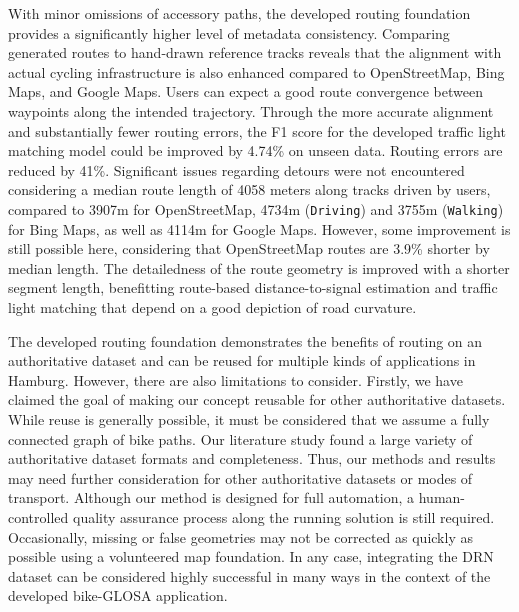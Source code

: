 With minor omissions of accessory paths, the developed routing foundation provides a significantly higher level of metadata consistency. Comparing generated routes to hand-drawn reference tracks reveals that the alignment with actual cycling infrastructure is also enhanced compared to OpenStreetMap, Bing Maps, and Google Maps. Users can expect a good route convergence between waypoints along the intended trajectory. Through the more accurate alignment and substantially fewer routing errors, the F1 score for the developed traffic light matching model could be improved by 4.74\% on unseen data. Routing errors are reduced by 41\%. Significant issues regarding detours were not encountered considering a median route length of 4058 meters along tracks driven by users, compared to 3907m for OpenStreetMap, 4734m (\texttt{Driving}) and 3755m (\texttt{Walking}) for Bing Maps, as well as 4114m for Google Maps. However, some improvement is still possible here, considering that OpenStreetMap routes are 3.9\% shorter by median length. The detailedness of the route geometry is improved with a shorter segment length, benefitting route-based distance-to-signal estimation and traffic light matching that depend on a good depiction of road curvature.

The developed routing foundation demonstrates the benefits of routing on an authoritative dataset and can be reused for multiple kinds of applications in Hamburg. However, there are also limitations to consider. Firstly, we have claimed the goal of making our concept reusable for other authoritative datasets. While reuse is generally possible, it must be considered that we assume a fully connected graph of bike paths. Our literature study found a large variety of authoritative dataset formats and completeness. Thus, our methods and results may need further consideration for other authoritative datasets or modes of transport. Although our method is designed for full automation, a human-controlled quality assurance process along the running solution is still required. Occasionally, missing or false geometries may not be corrected as quickly as possible using a volunteered map foundation. In any case, integrating the DRN dataset can be considered highly successful in many ways in the context of the developed bike-GLOSA application.

